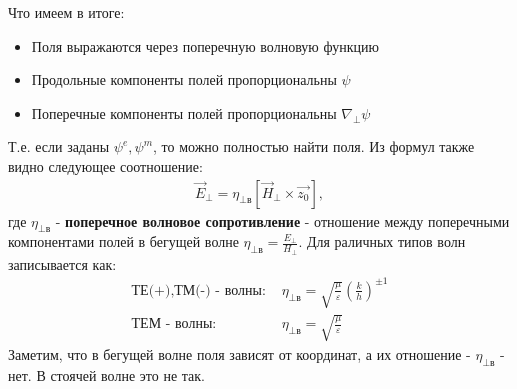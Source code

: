 Что имеем в итоге:
\begin{itemize}
  \item Поля выражаются через поперечную волновую функцию
  \item Продольные компоненты полей пропорциональны $\psi$
  \item Поперечные компоненты полей пропорциональны $\nabla_{\perp} \psi$
\end{itemize}
Т.е. если заданы $\psi^e,\psi^m$, то можно полностью найти поля. Из формул также видно следующее соотношение:
\begin{align*}
  \vec{E}_{\perp} = \eta_{\perp \text{в}}[\vec{H}_{\perp}\times \vec{z_0}] ,
\end{align*}
где $\eta_{\perp \text{в}}$  - \textbf{поперечное волновое сопротивление} - отношение между поперечными компонентами полей в
бегущей волне $\eta_{\perp \text{в}} = \frac{E_{\perp}}{H_{\perp}}$.
Для раличных типов волн записывается как:
\begin{align*}
  \text{ТЕ(+),ТМ(-) - волны: }&\eta_{\perp \text{в}} = \sqrt{\frac{\mu}{\varepsilon}}\left(\frac{k}{h}\right)^{\pm1}\\
  \text{ТЕМ - волны: }&\eta_{\perp \text{в}} = \sqrt{\frac{\mu}{\varepsilon}}
\end{align*}
Заметим, что в бегущей волне поля зависят от координат, а их отношение - $\eta_{\perp \text{в}}$ - нет. В стоячей волне
это не так.

